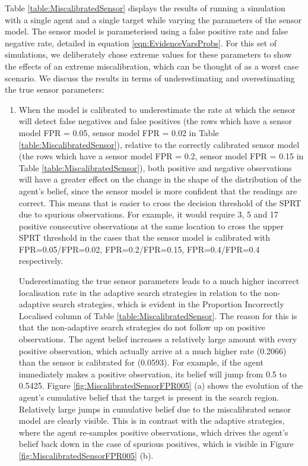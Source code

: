 Table \ref{table:MiscalibratedSensor} displays the results of running a simulation with a single agent and a single target while varying the parameters of the sensor model. The sensor model is parameterised using a false positive rate and false negative rate, detailed in equation \ref{eqn:EvidenceVarsProbs}. For this set of simulations, we deliberately chose extreme values for these parameters to show the effects of an extreme miscalibration, which can be thought of as a worst case scenario. We discuss the results in terms of underestimating and overestimating the true sensor parameters:
\begin{enumerate}
    \item When the model is calibrated to underestimate the rate at which the sensor will detect false negatives and false positives (the rows which have a sensor model FPR = 0.05, sensor model FPR = 0.02 in Table \ref{table:MiscalibratedSensor}), relative to the correctly calibrated sensor model (the rows which have a sensor model FPR = 0.2, sensor model FPR = 0.15 in Table \ref{table:MiscalibratedSensor}), both positive and negative observations will have a greater effect on the change in the shape of the distribution of the agent's belief, since the sensor model is more confident that the readings are correct. This means that is easier to cross the decision threshold of the SPRT due to spurious observations. For example, it would require 3, 5 and 17 positive consecutive observations at the same location to cross the upper SPRT threshold in the cases that the sensor model is calibrated with FPR=0.05/FPR=0.02, FPR=0.2/FPR=0.15, FPR=0.4/FPR=0.4 respectively.
    \par Underestimating the true sensor parameters leads to a much higher incorrect localisation rate in the adaptive search strategies in relation to the non-adaptive search strategies, which is evident in the Proportion Incorrectly Localised column of Table \ref{table:MiscalibratedSensor}. The reason for this is that the non-adaptive search strategies do not follow up on positive observations. The agent belief increases a relatively large amount with every positive observation, which actually arrive at a much higher rate (0.2066) than the sensor is calibrated for (0.0593). For example, if the agent immediately makes a positive observation, its belief will jump from 0.5 to 0.5425. Figure \ref{fig:MiscalibratedSensorFPR005} (a) shows the evolution of the agent's cumulative belief that the target is present in the search region. Relatively large jumps in cumulative belief due to the miscalibrated sensor model are clearly visible. This is in contrast with the adaptive strategies, where the agent re-samples positive observations, which drives the agent's belief back down in the case of spurious positives, which is visible in Figure \ref{fig:MiscalibratedSensorFPR005} (b).
    

\end{enumerate}

